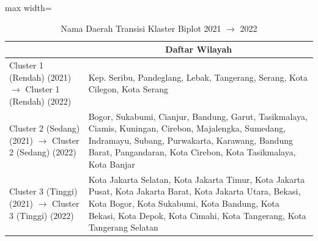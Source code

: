 \begin{table}[H]
\centering
\caption{Nama Daerah Transisi Klaster Biplot 2021 \(\rightarrow\) 2022} \label{tab:app1biplot_trans_name_2021x2022}
\begin{adjustbox}{max width=\textwidth}
\begin{tabular}{|>{\centering\arraybackslash}p{4cm}|p{10cm}|}
\hline
\multicolumn{1}{|c|}{\textbf{Kategori}} & \multicolumn{1}{c|}{\textbf{Daftar Wilayah}} \\
\hline
Cluster 1 (Rendah) (2021) \(\rightarrow\) Cluster 1 (Rendah) (2022) & Kep. Seribu, Pandeglang, Lebak, Tangerang, Serang, Kota Cilegon, Kota Serang \\
\hline
Cluster 2 (Sedang) (2021) \(\rightarrow\) Cluster 2 (Sedang) (2022) & Bogor, Sukabumi, Cianjur, Bandung, Garut, Tasikmalaya, Ciamis, Kuningan, Cirebon, Majalengka, Sumedang, Indramayu, Subang, Purwakarta, Karawang, Bandung Barat, Pangandaran, Kota Cirebon, Kota Tasikmalaya, Kota Banjar \\
\hline
Cluster 3 (Tinggi) (2021) \(\rightarrow\) Cluster 3 (Tinggi) (2022) & Kota Jakarta Selatan, Kota Jakarta Timur, Kota Jakarta Pusat, Kota Jakarta Barat, Kota Jakarta Utara, Bekasi, Kota Bogor, Kota Sukabumi, Kota Bandung, Kota Bekasi, Kota Depok, Kota Cimahi, Kota Tangerang, Kota Tangerang Selatan \\
\hline
\end{tabular}
\end{adjustbox}
\end{table}